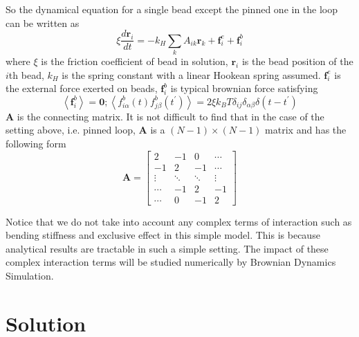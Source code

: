 \documentclass[12pt,a4paper]{article}
\begin{document}
So the dynamical equation for a single bead except the pinned one in the loop
can be written as 
\begin{equation}
    \label{eq:bead}
    \xi \frac{d \mathbf{r}_i}{dt} = - k_H \sum_{k} A_{ik} \mathbf{r}_k + \mathbf{f}_i^e + \mathbf{f}_i^b
\end{equation}
where $\xi$ is the friction coefficient of bead in solution, $\mathbf{r}_i$ is
the bead position of the $i$th bead, $k_H$ is the spring constant with a linear
Hookean spring assumed. $\mathbf{f}_i^e$ is the external force exerted on beads,
$\mathbf{f}_i^b$ is typical brownian force satisfying 
\begin{equation}
    \label{eq:brownian}
    \left<\mathbf{f}_i^b\right> = \mathbf 0; 
    \left<f_{i\alpha}^b(t)f_{j\beta}^b(t^\prime)\right> = 2\xi k_B T \delta_{ij}
    \delta_{\alpha\beta}\delta(t-t^\prime)
\end{equation}
$\mathbf A$ is the connecting matrix. It is not difficult to find that in the
case of the setting above, i.e. pinned loop, $\mathbf{A}$ is a $(N-1)\times
(N-1)$ matrix and has the following form
\begin{equation}
    \label{eq:connectMatrix}
    \mathbf{A} = \begin{bmatrix}
        2 & -1 & 0   & \cdots   \\
        -1 & 2 & -1  &  \cdots  \\
        \vdots & \ddots &\ddots&\vdots\\
        \cdots & -1 &2 & -1 \\
        \cdots & 0 &-1 &2
    \end{bmatrix}
\end{equation}

Notice that we do not take into account any complex terms of interaction such as
bending stiffness and exclusive effect in this simple model.  This is because
analytical results are tractable in such a simple setting. The impact of these
complex interaction terms will be studied numerically by Brownian Dynamics
Simulation.  

\section{Solution}
\label{sec:solution}
\end{document}
